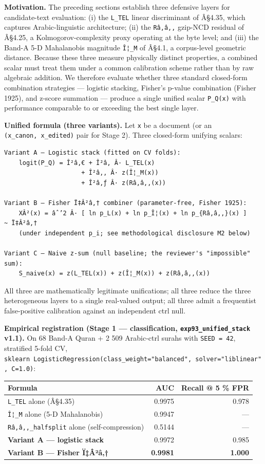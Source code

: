 \documentclass[
]{article}
\newcounter{none} %
\begin{document}
\textbf{Motivation.} The preceding sections establish three defensive
layers for candidate-text evaluation: (i) the \texttt{L\_TEL} linear
discriminant of Â§4.35, which captures Arabic-linguistic architecture;
(ii) the \texttt{Râ‚â‚‚} gzip-NCD residual of Â§4.25, a
Kolmogorov-complexity proxy operating at the byte level; and (iii) the
Band-A 5-D Mahalanobis magnitude \texttt{Î¦\_M} of Â§4.1, a corpus-level
geometric distance. Because these three measure physically distinct
properties, a combined scalar must treat them under a common calibration
scheme rather than by raw algebraic addition. We therefore evaluate
whether three standard closed-form combination strategies --- logistic
stacking, Fisher's p-value combination (Fisher 1925), and z-score
summation --- produce a single unified scalar \texttt{P\_Q(x)} with
performance comparable to or exceeding the best single layer.

\textbf{Unified formula (three variants).} Let \texttt{x} be a document
(or an \texttt{(x\_canon,\ x\_edited)} pair for Stage 2). Three
closed-form unifying scalars:

\begin{verbatim}
Variant A — Logistic stack (fitted on CV folds):
    logit(P_Q) = Î²â‚€ + Î²â‚ Â· L_TEL(x)
                     + Î²â‚‚ Â· z(Î¦_M(x))
                     + Î²â‚ƒ Â· z(Râ‚â‚‚(x))

Variant B — Fisher Ï‡Â²â‚† combiner (parameter-free, Fisher 1925):
    XÂ²(x) = âˆ’2 Â· [ ln p_L(x) + ln p_Î¦(x) + ln p_{Râ‚â‚‚}(x) ]    ~ Ï‡Â²â‚†
    (under independent p_i; see methodological disclosure M2 below)

Variant C — Naive z-sum (null baseline; the reviewer's "impossible" sum):
    S_naive(x) = z(L_TEL(x)) + z(Î¦_M(x)) + z(Râ‚â‚‚(x))
\end{verbatim}

All three are mathematically legitimate unifications; all three reduce
the three heterogeneous layers to a single real-valued output; all three
admit a frequentist false-positive calibration against an independent
ctrl null.

\textbf{Empirical registration (Stage 1 --- classification,
\texttt{exp93\_unified\_stack} v1.1).} On 68 Band-A Quran + 2 509
Arabic-ctrl surahs with \texttt{SEED\ =\ 42}, stratified 5-fold CV,
\texttt{sklearn\ LogisticRegression(class\_weight="balanced",\ solver="liblinear",\ C=1.0)}:

{\def\LTcaptype{none} %
\begin{longtable}[]{@{}lrr@{}}
\toprule\noalign{}
Formula & AUC & Recall @ 5 \% FPR \\
\midrule\noalign{}
\endhead
\bottomrule\noalign{}
\endlastfoot
\texttt{L\_TEL} alone (Â§4.35) & 0.9975 & 0.978 \\
\texttt{Î¦\_M} alone (5-D Mahalanobis) & 0.9947 & --- \\
\texttt{Râ‚â‚‚\_halfsplit} alone (self-compression) & 0.5144 & --- \\
\textbf{Variant A --- logistic stack} & 0.9972 & 0.985 \\
\textbf{Variant B --- Fisher Ï‡Â²â‚†} & \textbf{0.9981} &
\textbf{1.000} \\
\end{longtable}
}
\end{document}
